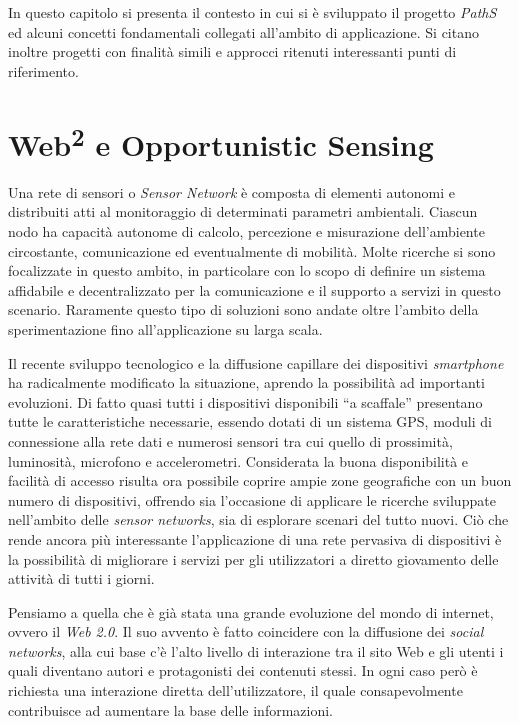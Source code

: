 In questo capitolo si presenta il contesto in cui si è sviluppato il progetto \emph{PathS} ed alcuni concetti fondamentali collegati all'ambito di applicazione. Si citano inoltre progetti con finalità simili e approcci ritenuti interessanti punti di riferimento.

\section{Web\textsuperscript{2} e Opportunistic Sensing}
Una rete di sensori o \emph{Sensor Network} è composta di elementi autonomi e distribuiti atti al monitoraggio di determinati parametri ambientali. Ciascun nodo ha capacità autonome di calcolo, percezione e misurazione dell'ambiente circostante, comunicazione ed eventualmente di mobilità. Molte ricerche si sono focalizzate in questo ambito, in particolare con lo scopo di definire un sistema affidabile e decentralizzato per la comunicazione e il supporto a servizi in questo scenario. Raramente questo tipo di soluzioni sono andate oltre l'ambito della sperimentazione fino all'applicazione su larga scala. 

Il recente sviluppo tecnologico e la diffusione capillare dei dispositivi \emph{smartphone} ha radicalmente modificato la situazione, aprendo la possibilità ad importanti evoluzioni. Di fatto quasi tutti i dispositivi disponibili ``a scaffale'' presentano tutte le caratteristiche necessarie, essendo dotati di un sistema GPS, moduli di connessione alla rete dati e numerosi sensori tra cui quello di prossimità, luminosità, microfono e accelerometri. Considerata la buona disponibilità e facilità di accesso risulta ora possibile coprire ampie zone geografiche con un buon numero di dispositivi, offrendo sia l'occasione di applicare le ricerche sviluppate nell'ambito delle \emph{sensor networks}, sia di esplorare scenari del tutto nuovi. Ciò che rende ancora più interessante l'applicazione di una rete pervasiva di dispositivi è la possibilità di migliorare i servizi per gli utilizzatori a diretto giovamento delle attività di tutti i giorni.

Pensiamo a quella che è già stata una grande evoluzione del mondo di internet, ovvero il \emph{Web 2.0}. Il suo avvento è fatto coincidere con la diffusione dei \emph{social networks}, alla cui base c'è l'alto livello di interazione tra il sito Web e gli utenti i quali diventano autori e protagonisti dei contenuti stessi. In ogni caso però è richiesta una interazione diretta dell'utilizzatore, il quale consapevolmente contribuisce ad aumentare la base delle informazioni. 

